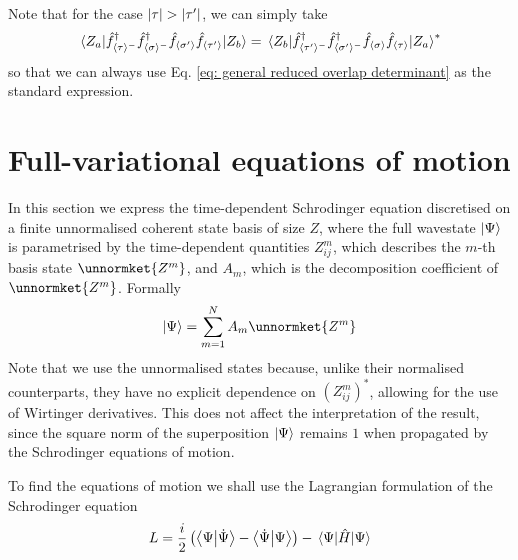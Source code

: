 \documentclass[12pt]{article}
\newcommand{\seq}[1]{\langle #1\rangle}
\newcommand{\hc}{^\dagger}
\begin{document}
	Note that for the case $\abs{\tau}>\abs{\tau'}$, we can simply take
	\begin{equation}
	\mel{Z_a}{\hat{f}\hc_{\seq{\tau}^-}\hat{f}\hc_{\seq{\sigma}^-}\hat{f}_{\seq{\sigma'}}\hat{f}_{\seq{\tau'}}}{Z_b}=\mel{Z_b}{\hat{f}\hc_{\seq{\tau'}^-}\hat{f}\hc_{\seq{\sigma'}^-}\hat{f}_{\seq{\sigma}}\hat{f}_{\seq{\tau}}}{Z_a}^*
	\end{equation}
	so that we can always use Eq. \ref{eq: general reduced overlap determinant} as the standard expression.
	
	\section{Full-variational equations of motion}
	In this section we express the time-dependent Schrodinger equation discretised on a finite unnormalised coherent state basis of size $Z$, where the full wavestate $\ket{\Psi}$ is parametrised by the time-dependent quantities $Z^m_{ij}$, which describes the $m$-th basis state $\unnormket{Z^m}$, and $A_m$, which is the decomposition coefficient of $\unnormket{Z^m}$. Formally
	\begin{equation}
	\ket{\Psi}=\sum_{m=1}^N A_m\unnormket{Z^m}
	\end{equation}
	Note that we use the unnormalised states because, unlike their normalised counterparts, they have no explicit dependence on $(Z^m_{ij})^*$, allowing for the use of Wirtinger derivatives. This does not affect the interpretation of the result, since the square norm of the superposition $\ket{\Psi}$ remains $1$ when propagated by the Schrodinger equations of motion.
	
	To find the equations of motion we shall use the Lagrangian formulation of the Schrodinger equation
	\begin{equation} \label{eq: schrodinger lagrangian}
	L=\frac{i}{2}\left(\braket{\Psi}{\dot{\Psi}}-\braket{\dot{\Psi}}{\Psi}\right)-\mel{\Psi}{\hat{H}}{\Psi}
	\end{equation}
	
\end{document}
